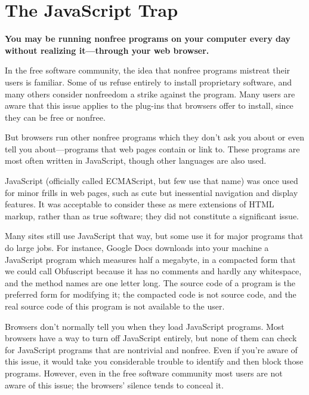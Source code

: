 \chapter{The JavaScript Trap}
\label{JavaScript Trap}


\begin{smallquotation}
\textbf{You may be running nonfree programs on your computer every day
without realizing it---through your web browser.}
\end{smallquotation}
\noindent
In the free software community, the idea that nonfree programs
mistreat their users is familiar.  Some of us refuse entirely to
install proprietary software, and many others consider nonfreedom a
strike against the program.  Many users are aware that this issue
applies to the plug-ins that browsers offer to install, since they can
be free or nonfree.

But browsers run other nonfree programs which they don't ask you
about or even tell you about---programs that web pages contain or
link to.  These programs are most often written in JavaScript, though
other languages are also used.

JavaScript (officially called 
ECMAScript, but few use that name) was once used for minor frills in
web pages, such as cute but inessential navigation and display
features.  It was acceptable to consider these as mere extensions of
HTML markup, rather than as true software; they did not constitute a
significant issue.

Many sites still use JavaScript that way, but some use it for major
programs that do large jobs.  For instance, 
Google Docs downloads into your machine a JavaScript program which
measures half a megabyte, in a compacted form that we could call
Obfuscript because it has no comments and hardly any whitespace, and
the method names are one letter long.  The source code of a program is
the preferred form for modifying it; the compacted code is not source
code, and the real source code of this program is not available to the
user.

Browsers don't normally tell you when they load JavaScript programs.
Most browsers have a way to turn off JavaScript entirely, but none of
them can check for JavaScript programs that are nontrivial and
nonfree.  Even if you're aware of this issue, it would take you
considerable trouble to identify and then block those programs.
However, even in the free software community most users are not aware
of this issue; the browsers' silence tends to conceal it.

